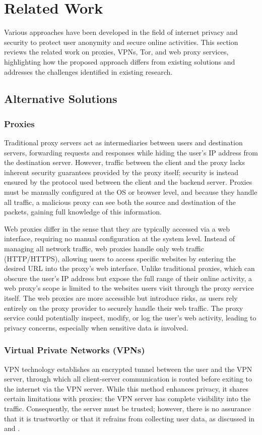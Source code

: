 \chapter{Related Work}\label{ch:sample-chapter}
Various approaches have been developed in the field of internet privacy and security to protect user anonymity and secure online activities. This section reviews the related work on proxies, VPNs, Tor, and web proxy services, highlighting how the proposed approach differs from existing solutions and addresses the challenges identified in existing research.

\section{Alternative Solutions}
\subsection{Proxies}
Traditional proxy servers act as intermediaries between users and destination servers, forwarding requests and responses while hiding the user's IP address from the destination server. However, traffic between the client and the proxy lacks inherent security guarantees provided by the proxy itself; security is instead ensured by the protocol used between the client and the backend server. Proxies must be manually configured at the OS or browser level, and because they handle all traffic, a malicious proxy can see both the source and destination of the packets, gaining full knowledge of this information.

Web proxies differ in the sense that they are typically accessed via a web interface, requiring no manual configuration at the system level. Instead of managing all network traffic, web proxies handle only web traffic \\(HTTP/HTTPS), allowing users to access specific websites by entering the desired URL into the proxy's web interface. Unlike traditional proxies, which can obscure the user's IP address but expose the full range of their online activity, a web proxy's scope is limited to the websites users visit through the proxy service itself. The web proxies are more accessible but introduce risks, as users rely entirely on the proxy provider to securely handle their web traffic. The proxy service could potentially inspect, modify, or log the user’s web activity, leading to privacy concerns, especially when sensitive data is involved.

\subsection{Virtual Private Networks (VPNs)}
VPN technology establishes an encrypted tunnel between the user and the VPN server, through which all client-server communication is routed before exiting to the internet via the VPN server. While this method enhances privacy, it shares certain limitations with proxies: the VPN server has complete visibility into the traffic. Consequently, the server must be trusted; however, there is no assurance that it is trustworthy or that it refrains from collecting user data, as discussed in \cite{285411} and \cite{10.1145/3278532.3278570}.

